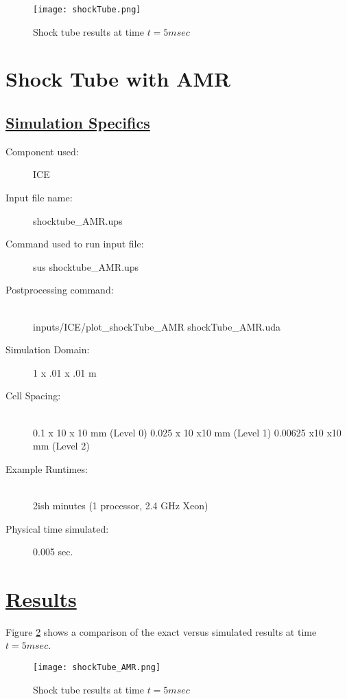 \begin{figure}
  \texttt{[image: shockTube.png]}
  \caption{Shock tube results at time $t = 5msec$}
  \label{results.ST}
  \end{figure}
\newpage


\section*{\center Shock Tube with AMR}
 
\subsection*{\underline{Simulation Specifics}}
\begin{description} 
\item [Component used:] \hfill ICE
\item [Input file name:] \hfill shocktube\_AMR.ups
\item [Command used to run input file:]\hfill sus shocktube\_AMR.ups
\item [Postprocessing command:]\hfill \\
inputs/ICE/plot\_shockTube\_AMR shockTube\_AMR.uda

\item [Simulation Domain:]\hfill    1 x .01 x .01 m
\item [Cell Spacing:]\hfill \\ 
0.1 x 10 x 10 mm (Level 0)
0.025 x 10 x10 mm (Level 1)
0.00625 x10 x10 mm (Level 2)


\item [Example Runtimes:] \hfill \\
 2ish minutes   (1 processor, 2.4 GHz Xeon)

\item [Physical time simulated:] \hfill 0.005 sec.

\end{description}

\section*{\underline{Results}}
Figure \ref{results.ST.AMR} shows a comparison of the exact versus simulated results at time $t = 5msec$.
\begin{figure}
  \texttt{[image: shockTube\_AMR.png]}
  \caption{Shock tube results at time $t = 5msec$}
  \label{results.ST.AMR}
  \end{figure}
\newpage

